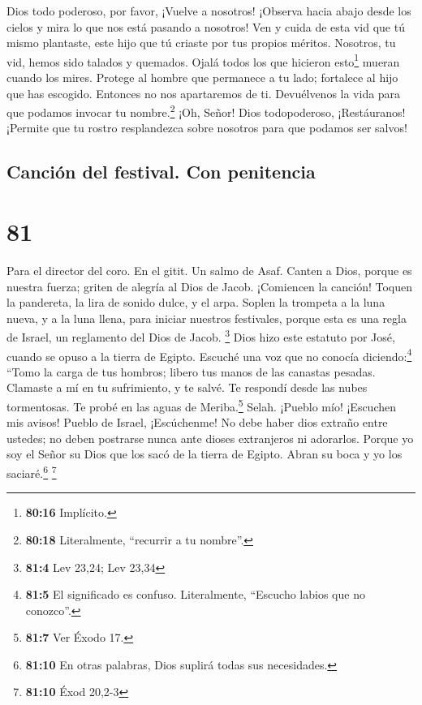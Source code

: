  Dios todo poderoso, por favor, ¡Vuelve a nosotros!
¡Observa hacia abajo desde los cielos y mira lo que nos está pasando a
nosotros! Ven y cuida de esta vid  que tú mismo
plantaste, este hijo que tú criaste por tus propios méritos.
 Nosotros, tu vid, hemos sido talados y quemados. Ojalá
todos los que hicieron esto\footnote{\textbf{80:16} Implícito.} mueran
cuando los mires.  Protege al hombre que permanece a tu
lado; fortalece al hijo que has escogido.  Entonces no
nos apartaremos de ti. Devuélvenos la vida para que podamos invocar tu
nombre.\footnote{\textbf{80:18} Literalmente, ``recurrir a tu nombre''.}
 ¡Oh, Señor! Dios todopoderoso, ¡Restáuranos! ¡Permite
que tu rostro resplandezca sobre nosotros para que podamos ser salvos!

\hypertarget{canciuxf3n-del-festival.-con-penitencia}{%
\subsection{Canción del festival. Con
penitencia}\label{canciuxf3n-del-festival.-con-penitencia}}

\hypertarget{section-80}{%
\section{81}\label{section-80}}

Para el director del coro. En el gitit. Un salmo de Asaf. 
Canten a Dios, porque es nuestra fuerza; griten de alegría al Dios de
Jacob.  ¡Comiencen la canción! Toquen la pandereta, la
lira de sonido dulce, y el arpa.  Soplen la trompeta a la
luna nueva, y a la luna llena, para iniciar nuestros festivales,
 porque esta es una regla de Israel, un reglamento del
Dios de Jacob. \footnote{\textbf{81:4} Lev 23,24; Lev 23,34}
 Dios hizo este estatuto por José, cuando se opuso a la
tierra de Egipto. Escuché una voz que no conocía diciendo:\footnote{\textbf{81:5}
  El significado es confuso. Literalmente, ``Escucho labios que no
  conozco''.}  ``Tomo la carga de tus hombros; libero tus
manos de las canastas pesadas.  Clamaste a mí en tu
sufrimiento, y te salvé. Te respondí desde las nubes tormentosas. Te
probé en las aguas de Meriba.\footnote{\textbf{81:7} Ver Éxodo 17.}
Selah.  ¡Pueblo mío! ¡Escuchen mis avisos! Pueblo de
Israel, ¡Escúchenme!  No debe haber dios extraño entre
ustedes; no deben postrarse nunca ante dioses extranjeros ni adorarlos.
 Porque yo soy el Señor su Dios que los sacó de la tierra
de Egipto. Abran su boca y yo los saciaré.\footnote{\textbf{81:10} En
  otras palabras, Dios suplirá todas sus necesidades.} \footnote{\textbf{81:10}
  Éxod 20,2-3}

